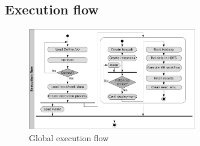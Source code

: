 \documentclass{sig-alternate}
\begin{document}
%  
%  
%  
% 
% 
%    
%  
% 




\subsection{Execution flow}\label{subsec:execution}

\begin{figure}[tp]
\centering
\includegraphics[width=0.65\textwidth]{img/006}
\caption{Global execution flow}
\label{fig:exflow}
\end{figure}
\end{document}
